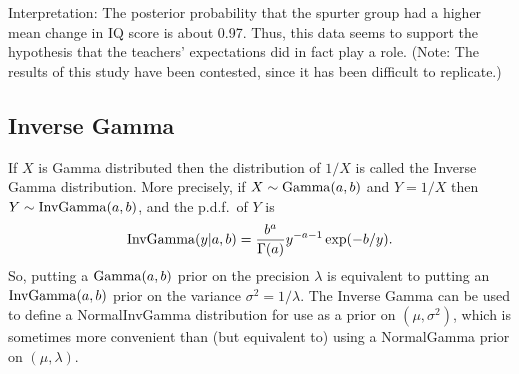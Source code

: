 \documentclass[12pt]{article}
\begin{document}
Interpretation: The posterior probability that the spurter group had a higher mean change in IQ score is about 0.97. Thus, this data seems to support the hypothesis that the teachers' expectations did in fact play a role. 
(Note: The results of this study have been contested, since it has been difficult to replicate.)













\subsection{Inverse Gamma}

If $X$ is Gamma distributed then the distribution of $1/X$ is called the Inverse Gamma distribution. More precisely, if $X\sim\operatorname*{Gamma}(a,b)$ and $Y=1/X$ then $Y\sim \operatorname*{InvGamma}(a,b)$, and the p.d.f.\ of $Y$ is
$$\operatorname*{InvGamma}(y|a,b) = \frac{b^a}{\Gamma(a)} y^{-a-1}\exp(-b/y). $$
So, putting a $\operatorname*{Gamma}(a,b)$ prior on the precision $\lambda$ is equivalent to putting an $\operatorname*{InvGamma}(a,b)$ prior on the variance $\sigma^2 = 1/\lambda$. The Inverse Gamma can be used to define a NormalInvGamma distribution for use as a prior on $(\mu,\sigma^2)$, which is sometimes more convenient than (but equivalent to) using a NormalGamma prior on $(\mu,\lambda)$.
\end{document}
